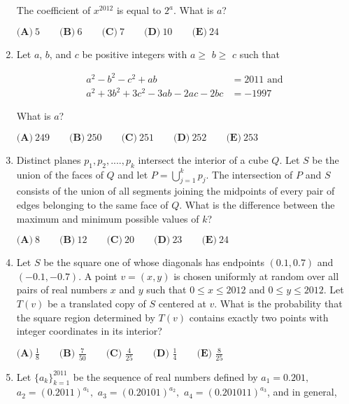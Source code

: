 \documentclass{article}
\begin{document}
\begin{enumerate}[label=\arabic*., itemsep=0.5em]
The coefficient of $x^{2012}$ is equal to $2^a$.  What is $a$?

$ \textbf{(A)}\ 5
\qquad\textbf{(B)}\ 6
\qquad\textbf{(C)}\ 7
\qquad\textbf{(D)}\ 10
\qquad\textbf{(E)}\ 24
 $\par \vspace{0.5em}\item Let $a$, $b$, and $c$ be positive integers with $a\ge$ $b\ge$ $c$ such that

\begin{align*}a^{2}-b^{2}-c^{2}+ab&=2011\text{ and}\\
a^{2}+3b^{2}+3c^{2}-3ab-2ac-2bc&=-1997
\end{align*}

What is $a$?

$ \textbf{(A)}\ 249\qquad\textbf{(B)}\ 250\qquad\textbf{(C)}\ 251\qquad\textbf{(D)}\ 252\qquad\textbf{(E)}\ 253 $\par \vspace{0.5em}\item Distinct planes $p_1,p_2,....,p_k$ intersect the interior of a cube $Q$. Let $S$ be the union of the faces of $Q$ and let $ P =\bigcup_{j=1}^{k}p_{j} $. The intersection of $P$ and $S$ consists of the union of all segments joining the midpoints of every pair of edges belonging to the same face of $Q$. What is the difference between the maximum and minimum possible values of $k$?

$ \textbf{(A)}\ 8\qquad\textbf{(B)}\ 12\qquad\textbf{(C)}\ 20\qquad\textbf{(D)}\ 23\qquad\textbf{(E)}\ 24 $\par \vspace{0.5em}\item Let $S$ be the square one of whose diagonals has endpoints $(0.1,0.7)$ and $(-0.1,-0.7)$.  A point $v=(x,y)$ is chosen uniformly at random over all pairs of real numbers $x$ and $y$ such that $0 \le x \le 2012$ and $0\le y\le 2012$.  Let $T(v)$ be a translated copy of $S$ centered at $v$.  What is the probability that the square region determined by $T(v)$ contains exactly two points with integer coordinates in its interior?

$ \textbf{(A)}\ \frac{1}{8}\qquad\textbf{(B) }\frac{7}{50}\qquad\textbf{(C) }\frac{4}{25}\qquad\textbf{(D) }\frac{1}{4}\qquad\textbf{(E) }\frac{8}{25} $\par \vspace{0.5em}\item Let $\{a_k\}_{k=1}^{2011}$ be the sequence of real numbers defined by $a_1=0.201,$ $a_2=(0.2011)^{a_1},$ $a_3=(0.20101)^{a_2},$ $a_4=(0.201011)^{a_3}$, and in general, 



\end{enumerate}
\end{document}
